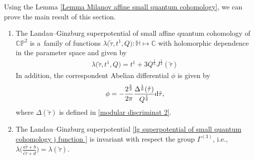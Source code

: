 Using the Lemma \ref{Lemma Milanov affine small quantum cohomology}, we can prove the main result of this section.

\begin{Theorem}\quad
\begin{enumerate}\itemsep=0pt
\item[$(1)$]
The Landau--Ginzburg superpotential of small affine quantum cohomology of $\mathbb{CP}^2$ is a~family of functions
$
\lambda\bigl(\tilde\tau, t^1, Q\bigr)\colon \mathbb{H} \mapsto \mathbb{C}
$
with holomorphic dependence in the parameter space 
 and given by
\begin{gather}\label{lg superpotential of small quantum cohomology j function }
\lambda\bigl(\tilde\tau, t^1, Q\bigr)=t^1+3Q^{\frac{1}{3}}J^{\frac{1}{3}}(\tilde\tau)
\end{gather}
 In addition, the correspondent Abelian differential $\phi$ is given by
\begin{gather}\label{small volume form 1}
\phi=-\frac{2^{\frac{5}{2}}}{2\pi}\frac{\Delta^{\frac{1}{6}}(\tilde\tau )}{Q^{\frac{1}{6}}}{\rm d}\tilde\tau,
\end{gather}
where $\Delta(\tilde\tau)$ is defined in \eqref{modular discriminat 2}.

\item[$(2)$] The Landau--Ginzburg superpotential \eqref{lg superpotential of small quantum cohomology j function } is invariant with respect the group $\Gamma^{(3)}$, i.e.,
$
\lambda\bigl(\frac{a\tilde\tau+b}{c\tilde\tau+d}\bigr)=\lambda(\tilde\tau)$.
\end{enumerate}
\end{Theorem}

